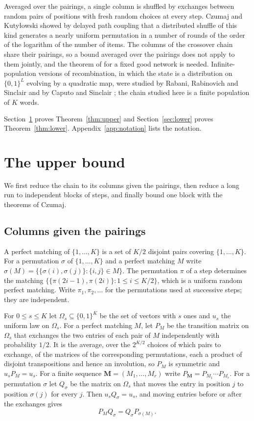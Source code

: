 \documentclass[11pt]{amsart}
\theoremstyle{remark}
\numberwithin{equation}{section}
\begin{document}
Averaged over the pairings, a single column is shuffled by exchanges between random pairs of positions with fresh random choices at every step. Czumaj and Kuty{\l}owski \cite{CK00} showed by delayed path coupling that a distributed shuffle of this kind generates a nearly uniform permutation in a number of rounds of the order of the logarithm of the number of items. The columns of the crossover chain share their pairings, so a bound averaged over the pairings does not apply to them jointly, and the theorem of \cite{Cz15} for a fixed good network is needed. Infinite-population versions of recombination, in which the state is a distribution on $\{0,1\}^L$ evolving by a quadratic map, were studied by Rabani, Rabinovich and Sinclair \cite{RRS98} and by Caputo and Sinclair \cite{CS18}; the chain studied here is a finite population of $K$ words.

Section~\ref{sec:upper} proves Theorem~\ref{thm:upper} and Section~\ref{sec:lower} proves Theorem~\ref{thm:lower}. Appendix~\ref{app:notation} lists the notation.

\section{The upper bound}\label{sec:upper}

We first reduce the chain to its columns given the pairings, then reduce a long run to independent blocks of steps, and finally bound one block with the theorems of Czumaj.

\subsection{Columns given the pairings}
A perfect matching of $\{1,\dots,K\}$ is a set of $K/2$ disjoint pairs covering $\{1,\dots,K\}$. For a permutation $\sigma$ of $\{1,\dots,K\}$ and a perfect matching $M$ write $\sigma(M)=\{\{\sigma(i),\sigma(j)\}:\{i,j\}\in M\}$. The permutation $\pi$ of a step determines the matching $\{\{\pi(2i-1),\pi(2i)\}:1\le i\le K/2\}$, which is a uniform random perfect matching. Write $\pi_1,\pi_2,\dots$ for the permutations used at successive steps; they are independent.

For $0\le s\le K$ let $\Omega_s\subseteq\{0,1\}^K$ be the set of vectors with $s$ ones and $u_s$ the uniform law on $\Omega_s$. For a perfect matching $M$, let $P_M$ be the transition matrix on $\Omega_s$ that exchanges the two entries of each pair of $M$ independently with probability $1/2$. It is the average, over the $2^{K/2}$ choices of which pairs to exchange, of the matrices of the corresponding permutations, each a product of disjoint transpositions and hence an involution, so $P_M$ is symmetric and $u_s P_M=u_s$. For a finite sequence $\mathbf M=(M_1,\dots,M_r)$ write $P_{\mathbf M}=P_{M_1}\cdots P_{M_r}$. For a permutation $\sigma$ let $Q_\sigma$ be the matrix on $\Omega_s$ that moves the entry in position $j$ to position $\sigma(j)$ for every $j$. Then $u_sQ_\sigma=u_s$, and moving entries before or after the exchanges gives
\begin{equation}\label{eq:conj}
P_MQ_\sigma=Q_\sigma P_{\sigma(M)}.
\end{equation}
\end{document}
